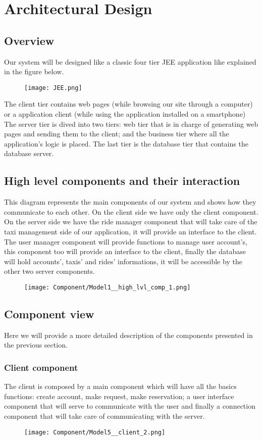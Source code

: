\section{Architectural Design}

\subsection{Overview}
	Our system will be designed like a classic four tier JEE application like explained in the figure below.
	\begin{figure}[h!]
		\centering
		\texttt{[image: JEE.png]}
	\end{figure}
	
	The client tier contains web pages (while browsing our site through a computer) or a application client (while using the application installed on a smartphone)
	The server tier is dived into two tiers: web tier that is in charge of generating web pages and sending them to the client; and the business tier where all the application's logic is placed. 
	The last tier is the database tier that contains the database server.
		
\subsection{High level components and their interaction}
	This diagram represents the main components of our system and shows how they communicate to each other. On the client side we have only the client component. 
	On the server side we have the ride manager component that will take care of the taxi management side of our application, it will provide an interface to the client. The user manager component will provide functions to manage user account's, this component too will provide an interface to the client, finally the database will hold accounts', taxis' and rides' informations, it will be accessible by the other two server components.
	\begin{figure}[h!]
		\centering
		\texttt{[image: Component/Model1\_\_high\_lvl\_comp\_1.png]}
	\end{figure}
	\newpage
	
\subsection{Component view}
	Here we will provide a more detailed description of the components presented in the previous section.
	\subsubsection{Client component}
	The client is composed by a main component which will have all the basics functions: create account, make request, make reservation; a user interface component that will serve to communicate with the user and finally a connection component that will take care of communicating with the server.
		\begin{figure}[h!]
			\centering
			\texttt{[image: Component/Model5\_\_client\_2.png]}
		\end{figure}
		\newpage

